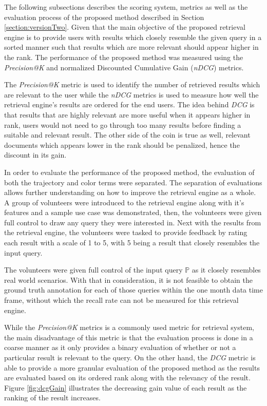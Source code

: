 The following subsections describes the scoring system, metrics as well as the evaluation process of the proposed method described in Section \ref{section:versionTwo}. Given that the main objective of the proposed retrieval engine is to provide users with results which closely resemble the given query in a sorted manner such that results which are more relevant should appear higher in the rank. The performance of the proposed method was measured using the \textit{Precision@K} and normalized Discounted Cumulative Gain (\textit{nDCG}) metrics.  

The \textit{Precision@K} metric is used to identify the number of retrieved results which are relevant to the user while the \textit{nDCG} metrics is used to measure how well the retrieval engine's results are ordered for the end users. The idea behind \textit{DCG} is that results that are highly relevant are more useful when it appears higher in rank, users would not need to go through too many results before finding a suitable and relevant result. The other side of the coin is true as well, relevant documents which appears lower in the rank should be penalized, hence the discount in its gain.

In order to evaluate the performance of the proposed method, the evaluation of both the trajectory and color terms were separated. The separation of evaluations allows further understanding on how to improve the retrieval engine as a whole. A group of volunteers were introduced to the retrieval engine along with it's features and a sample use case was demonstrated, then, the volunteers were given full control to draw any query they were interested in. Next with the results from the retrieval engine, the volunteers were tasked to provide feedback by rating each result with a scale of 1 to 5, with 5 being a result that closely resembles the input query. 

The volunteers were given full control of the input query $\mathbb{P}$ as it closely resembles real world scenarios. With that in consideration, it is not feasible to obtain the ground truth annotation for each of those queries within the one month data time frame, without which the recall rate can not be measured for this retrieval engine. 

While the \textit{Precision@K} metrics is a commonly used metric for retrieval system, the main disadvantage of this metric is that the evaluation process is done in a coarse manner as it only provides a binary evaluation of whether or not a particular result is relevant to the query. On the other hand, the \textit{DCG} metric is able to provide a more granular evaluation of the proposed method as the results are evaluated based on its ordered rank along with the relevancy of the result. Figure \ref{fig:dcgGain} illustrates the decreasing gain value of each result as the ranking of the result increases. 

